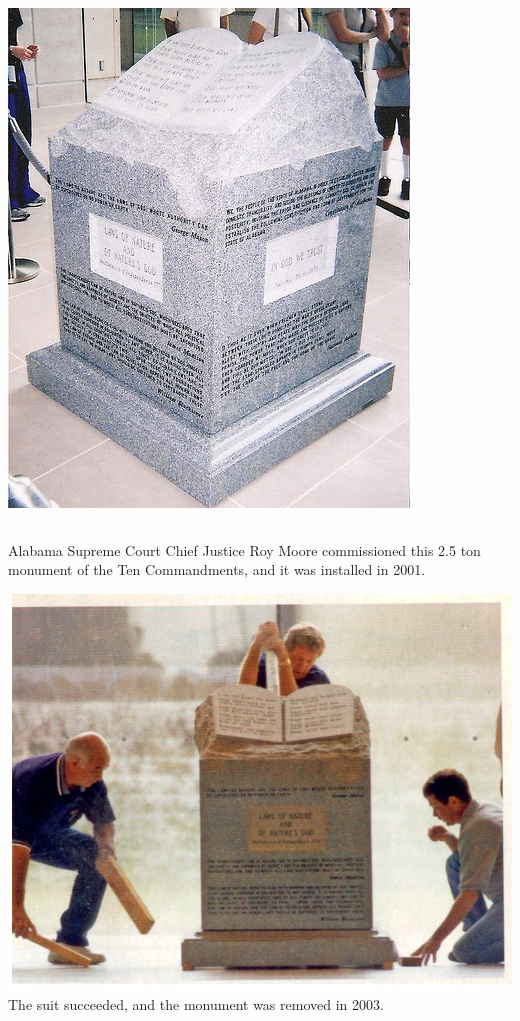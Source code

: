\begin{frame}
\begin{columns}[onlytextwidth]
        \includegraphics[height=.65\textheight]{img/10-commandments-2.jpg} \\
    \end{columns}
    \vspace{16pt}
    Alabama Supreme Court Chief Justice Roy Moore commissioned this 2.5 ton
    monument of the Ten Commandments, and it was installed in 2001. \\
\end{frame}


\begin{frame}
    \centering
    \includegraphics[width=.65\textwidth]{img/10-commandments.jpg} \\
    The suit succeeded, and the monument was removed in 2003. \\
\end{frame}

